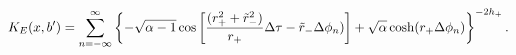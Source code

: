 \begin{equation}
K_E(x,b') = \sum_{n=-\infty}^{\infty} \left\{ - \sqrt{\alpha-1}
\cos\left[{(r_+^2 + \tilde r_-^2) \over r_+}
\Delta \tau - \tilde r_- \Delta \phi_n) \right] + \sqrt{\alpha} \cosh( r_+
\Delta \phi_n) \right\}^{-2h_+}.
\end{equation}

